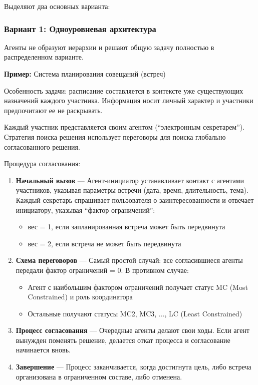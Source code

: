Выделяют два основных варианта:

\subsubsection{Вариант 1: Одноуровневая архитектура}

Агенты не образуют иерархии и решают общую задачу полностью в распределенном варианте.

\textbf{Пример:} Система планирования совещаний (встреч)

Особенность задачи: расписание составляется в контексте уже существующих назначений каждого участника. Информация носит личный характер и участники предпочитают ее не раскрывать.

Каждый участник представляется своим агентом (``электронным секретарем''). Стратегия поиска решения использует переговоры для поиска глобально согласованного решения.

Процедура согласования:

\begin{enumerate}
  \item \textbf{Начальный вызов} — Агент-инициатор устанавливает контакт с агентами участников, указывая параметры встречи (дата, время, длительность, тема). Каждый секретарь спрашивает пользователя о заинтересованности и отвечает инициатору, указывая ``фактор ограничений'':
    \begin{itemize}
      \item вес = 1, если запланированная встреча может быть передвинута
      \item вес = 2, если встреча не может быть передвинута
    \end{itemize}
  \item \textbf{Схема переговоров} — Самый простой случай: все согласившиеся агенты передали фактор ограничений = 0. В противном случае:
    \begin{itemize}
      \item Агент с наибольшим фактором ограничений получает статус MC (Most Constrained) и роль координатора
      \item Остальные получают статусы MC2, MC3, ..., LC (Least Constrained)
    \end{itemize}
  \item \textbf{Процесс согласования} — Очередные агенты делают свои ходы. Если агент вынужден поменять решение, делается откат процесса и согласование начинается вновь.
  \item \textbf{Завершение} — Процесс заканчивается, когда достигнута цель, либо встреча организована в ограниченном составе, либо отменена.
\end{enumerate}

